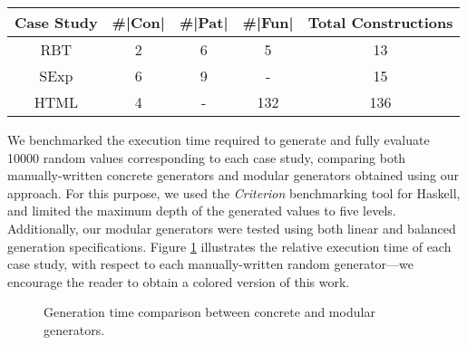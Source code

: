 \begin{table}[H]
  \begin{tabular}{||c||c||c||c||c||}
    \hline
    Case Study & \#|Con| & \#|Pat| & \#|Fun| & Total Constructions \\ \hline
    \hline
    RBT        & 2      & 6      & 5      & 13                  \\ \hline
    SExp       & 6      & 9      & -      & 15                  \\ \hline
    HTML       & 4      & -      & 132    & 136                 \\ \hline
  \end{tabular}
\end{table}

We benchmarked the execution time required to generate and fully evaluate 10000
random values corresponding to each case study, comparing both manually-written
concrete generators and modular generators obtained using our approach.
%
For this purpose, we used the \emph{Criterion} benchmarking tool for Haskell,
and limited the maximum depth of the generated values to five levels.
%
Additionally, our modular generators were tested using both linear and balanced
generation specifications.
%
Figure \ref{fig:times} illustrates the relative execution time of each case
study, with respect to each manually-written random generator---we encourage the
reader to obtain a colored version of this work.

\begin{figure}[b]
  \centering
  \caption{Generation time comparison between concrete and modular generators.}
  \label{fig:times}
\end{figure}

